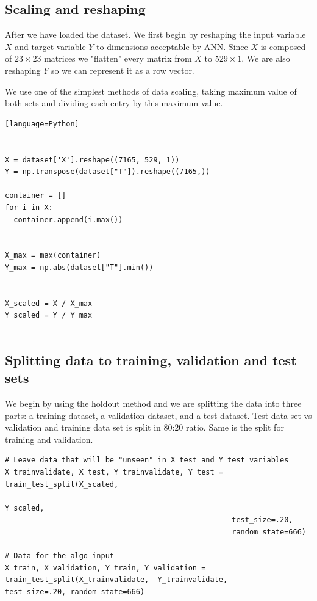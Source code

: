\documentclass[a4paper,oneside,openright,11pt]{book}
\begin{document}
\subsection{Scaling and reshaping}

After we have loaded the dataset. We first begin by reshaping the input variable $X$ and target variable $Y$ to dimensions acceptable by ANN. Since $X$ is composed of  $23 \times 23$ matrices we "flatten" every matrix from $X$ to $529 \times 1$. We are also reshaping $Y$ so we can represent it as a row vector.

We use one of the simplest methods of data scaling, taking maximum value of both sets and dividing each entry by this maximum value.

\begin{verbatim}[language=Python]


X = dataset['X'].reshape((7165, 529, 1)) 
Y = np.transpose(dataset["T"]).reshape((7165,))

container = []
for i in X:
  container.append(i.max())
  

X_max = max(container)
Y_max = np.abs(dataset["T"].min())


X_scaled = X / X_max
Y_scaled = Y / Y_max


\end{verbatim}

\subsection{Splitting data to training, validation and test sets}

We begin by using the holdout method and we are splitting the data into three parts: a training dataset, a validation dataset, and a test dataset. Test data set vs validation and training data set is split in 80:20 ratio. Same is the split for training and validation.


\begin{verbatim}
# Leave data that will be "unseen" in X_test and Y_test variables
X_trainvalidate, X_test, Y_trainvalidate, Y_test = train_test_split(X_scaled, 
                                                                    Y_scaled,  
                                                    test_size=.20, 
                                                    random_state=666)

# Data for the algo input
X_train, X_validation, Y_train, Y_validation = train_test_split(X_trainvalidate,  Y_trainvalidate,  
test_size=.20, random_state=666)
\end{verbatim}
\end{document}
